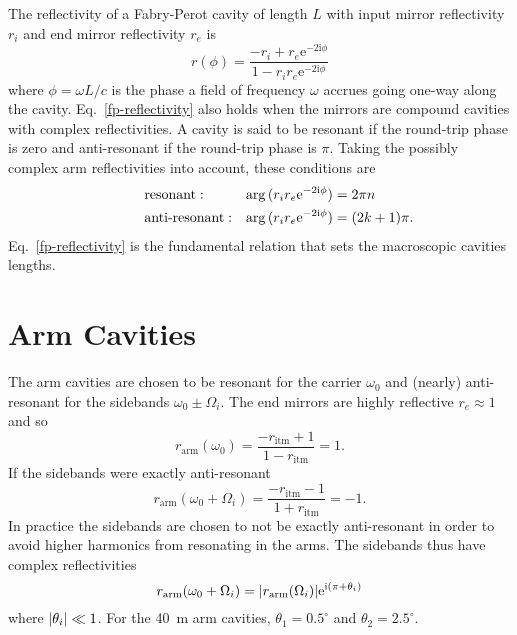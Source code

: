 \documentclass[12pt]{article}
\newcommand{\mr}[1]{\mathrm{#1}}
\newcommand{\e}{\mr{e}}
\renewcommand{\i}{\mr{i}}
\newcommand{\abs}[1]{\left|#1\right|}
\let\originalleft\left
\let\originalright\right
\renewcommand{\left}{\mathopen{}\mathclose\bgroup\originalleft}
\renewcommand{\right}{\aftergroup\egroup\originalright}
\begin{document}
The reflectivity of a Fabry-Perot cavity of length $L$ with input mirror reflectivity $r_i$ and end mirror reflectivity $r_e$ is
\begin{equation}
r(\phi) = \frac{-r_i + r_e \e^{-2\i\phi}}{1 - r_i r_e \e^{-2\i\phi}}
\label{fp-reflectivity}
\end{equation}
where $\phi = \omega L/c$ is the phase a field of frequency $\omega$ accrues going one-way along the cavity. Eq.~\eqref{fp-reflectivity} also holds when the mirrors are compound cavities with complex reflectivities. A cavity is said to be resonant if the round-trip phase is zero and anti-resonant if the round-trip phase is $\pi$. Taking the possibly complex arm reflectivities into account, these conditions are
\begin{subequations}
\begin{align}
\hspace{0.2\textwidth} &\text{resonant}: & \arg{(r_i r_e \e^{-2\i\phi})} &= 2\pi n \hspace{0.2\textwidth}\\
&\text{anti-resonant}: &\arg{(r_i r_e \e^{-2\i\phi})} &= (2k + 1)\pi.
\end{align}
\end{subequations}
Eq.~\eqref{fp-reflectivity} is the fundamental relation that sets the macroscopic cavities lengths.

\section{Arm Cavities}

The arm cavities are chosen to be resonant for the carrier $\omega_0$ and (nearly) anti-resonant for the sidebands $\omega_0 \pm \Omega_i$. The end mirrors are highly reflective $r_e\approx 1$ and so
\begin{equation}
r_\mr{arm}(\omega_0) = \frac{-r_\mr{itm} + 1}{1 - r_\mr{itm}} = 1.
\end{equation}
If the sidebands were exactly anti-resonant
\begin{equation}
r_\mr{arm}(\omega_0 + \Omega_i) = \frac{-r_\mr{itm} - 1}{1 + r_\mr{itm}} = -1.
\end{equation}
In practice the sidebands are chosen to not be exactly anti-resonant in order to avoid higher harmonics from resonating in the arms. The sidebands thus have complex reflectivities
\begin{equation}
r_\mr{arm}(\omega_0 + \Omega_i) = \abs{r_\mr{arm}(\Omega_i)}\e^{\i (\pi + \theta_i)}
\label{arm-reflectivity}
\end{equation}
where $\abs{\theta_i} \ll 1$. For the 40~m arm cavities, $\theta_1 = 0.5^\circ$ and $\theta_2 = 2.5^\circ$.
\end{document}
